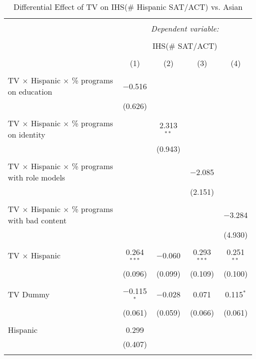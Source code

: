 
\begin{table}[!htbp] \centering 
  \caption{Differential Effect of TV on IHS(\# Hispanic SAT/ACT) vs. Asian} 
  \label{} 
\begin{tabular}{@{\extracolsep{-2pt}}lcccc} 
\\[-1.8ex]\hline 
\hline \\[-1.8ex] 
 & \multicolumn{4}{c}{\textit{Dependent variable:}} \\ 
\cline{2-5} 
\\[-1.8ex] & \multicolumn{4}{c}{IHS(\# SAT/ACT)} \\ 
\\[-1.8ex] & (1) & (2) & (3) & (4)\\ 
\hline \\[-1.8ex] 
 TV $\times$ Hispanic $\times$ \% programs on education & $-$0.516 &  &  &  \\ 
  & (0.626) &  &  &  \\ 
  & & & & \\ 
 TV $\times$ Hispanic $\times$ \% programs on identity &  & 2.313$^{**}$ &  &  \\ 
  &  & (0.943) &  &  \\ 
  & & & & \\ 
 TV $\times$ Hispanic $\times$ \% programs with role models &  &  & $-$2.085 &  \\ 
  &  &  & (2.151) &  \\ 
  & & & & \\ 
 TV $\times$ Hispanic $\times$ \% programs with bad content &  &  &  & $-$3.284 \\ 
  &  &  &  & (4.930) \\ 
  & & & & \\ 
 TV $\times$ Hispanic & 0.264$^{***}$ & $-$0.060 & 0.293$^{***}$ & 0.251$^{**}$ \\ 
  & (0.096) & (0.099) & (0.109) & (0.100) \\ 
  & & & & \\ 
 TV Dummy & $-$0.115$^{*}$ & $-$0.028 & 0.071 & 0.115$^{*}$ \\ 
  & (0.061) & (0.059) & (0.066) & (0.061) \\ 
  & & & & \\ 
 Hispanic & 0.299 &  &  &  \\ 
  & (0.407) &  &  &  \\ 
  & & & & \\ 

\end{tabular}
\end{table}
